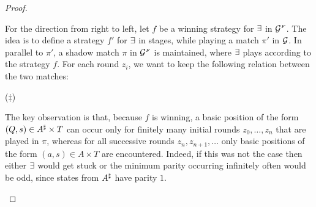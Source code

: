 \begin{proof}
\begin{enumerate}[(i)]
      For the direction from right to left, let $f$ be a winning strategy for $\exists$ in $\mathcal{G}^{{\scriptscriptstyle F}}$. The idea is to define a strategy $f'$ for $\exists$ in stages, while playing a match $\pi'$ in $\mathcal{G}$. In parallel to $\pi'$, a shadow match $\pi$ in $\mathcal{G}^{{\scriptscriptstyle F}}$ is maintained, where $\exists$ plays according to the strategy $f$. For each round $z_i$, we want to keep the following relation between the two matches:
\smallskip
\begin{center}
\hspace*{0.3cm}($\ddag$)
\end{center}
\smallskip
The key observation is that, because $f$ is winning, a basic position of the form $(Q,s) \in A^{\sharp} \times T$ can occur only for finitely many initial rounds $z_0,\dots,z_n$ that are played in $\pi$, whereas for all successive rounds $z_n,z_{n+1},\dots$ only basic positions of the form $(a,s) \in A \times T$ are encountered. Indeed, if this was not the case then either $\exists$ would get stuck or the minimum parity occurring infinitely often would be odd, since states from $A^{\sharp}$ have parity $1$.


\end{enumerate}
\end{proof}

